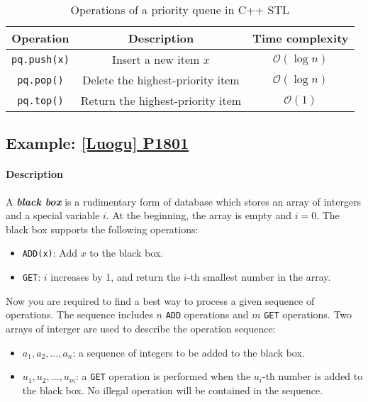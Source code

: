 \documentclass[12pt,a4paper]{ctexart}
\newcommand{\highlight}[1]{\textbf{\textit{#1}}}
\begin{document}
    \begin{table}[!htbp]
        \centering
        \begin{tabular}{ccc}
            \toprule
            Operation & Description & Time complexity \\
            \midrule
            \texttt{pq.push(x)} & Insert a new item $x$ & $\mathcal O(\log n)$ \\
            \texttt{pq.pop()} & Delete the highest-priority item & $\mathcal O(\log n)$ \\
            \texttt{pq.top()} & Return the highest-priority item & $\mathcal O(1)$ \\
            \bottomrule
        \end{tabular}
        \caption{Operations of a priority queue in C++ STL}
        \label{tab:Operations of a priority queue in C++ STL}
    \end{table}

    \subsection{Example: \href{https://www.luogu.com.cn/problem/P1801}{[Luogu] P1801}}

    \paragraph{Description}

    A \highlight{black box} is a rudimentary form of database which stores an array of intergers and a special variable $i$. At the beginning, the array is empty and $i=0$. The black box supports the following operations:

    \begin{itemize}
        \item \texttt{ADD(x)}: Add $x$ to the black box.
        \item \texttt{GET}: $i$ increases by 1, and return the $i$-th smallest number in the array.
    \end{itemize}

    Now you are required to find a best way to process a given sequence of operations. The sequence includes $n$ \texttt{ADD} operations and $m$ \texttt{GET} operations. Two arrays of interger are used to describe the operation sequence:

    \begin{itemize}
        \item $a_1,a_2,\dots,a_n$: a sequence of integers to be added to the black box.
        \item $u_1,u_2,\dots,u_m$: a \texttt{GET} operation is performed when the $u_i$-th number is added to the black box. No illegal operation will be contained in the sequence.
    \end{itemize}
\end{document}
